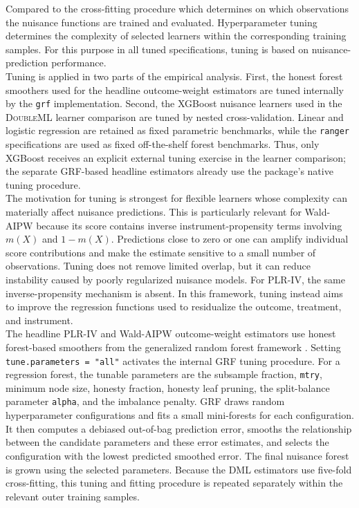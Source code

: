 \documentclass[12pt, a4paper, oneside]{article}
\theoremstyle{plain}
\theoremstyle{definition}
\begin{document}
Compared to the cross-fitting procedure which determines on which observations the nuisance functions are trained and evaluated.
 Hyperparameter tuning determines the complexity of selected
learners within the corresponding training samples.
For this purpose in all tuned specifications, tuning is based on nuisance-prediction performance.\\
Tuning is applied in two parts of the empirical analysis. First, the honest
forest smoothers used for the headline outcome-weight estimators are tuned
internally by the \texttt{grf} implementation. Second, the XGBoost nuisance
learners used in the \textsc{DoubleML} learner comparison are tuned by nested
cross-validation. Linear and logistic regression are retained as fixed
parametric benchmarks, while the \texttt{ranger} specifications are used as
fixed off-the-shelf forest benchmarks. 
Thus, only XGBoost receives an explicit
external tuning exercise in the learner comparison; the separate GRF-based
headline estimators already use the package's native tuning procedure.\\
The motivation for tuning is strongest for flexible learners whose complexity
can materially affect nuisance predictions. This is particularly relevant for
Wald-AIPW because its score contains inverse instrument-propensity terms
involving \(m(X)\) and \(1-m(X)\). Predictions close to zero or one can amplify
individual score contributions and make the estimate sensitive to a small
number of observations. Tuning does not remove limited overlap, but it can
reduce instability caused by poorly regularized nuisance models. For PLR-IV,
the same inverse-propensity mechanism is absent.
In this framework, tuning instead aims to
improve the regression functions used to residualize the outcome, treatment,
and instrument.\\
The headline PLR-IV and Wald-AIPW outcome-weight estimators use honest
forest-based smoothers from the generalized random forest framework
\citep{athey2019generalized,knaus2024treatment}. Setting
\texttt{tune.parameters = "all"} activates the internal GRF tuning procedure.
For a regression forest, the tunable parameters are the subsample fraction,
\texttt{mtry}, minimum node size, honesty fraction, honesty leaf pruning,
the split-balance parameter \texttt{alpha}, and the imbalance penalty.
GRF draws random hyperparameter configurations and fits a small
mini-forests for each configuration. It then computes a debiased
out-of-bag prediction error, smooths the relationship between the candidate
parameters and these error estimates, and selects the configuration with the
lowest predicted smoothed error. The final nuisance forest is grown using the
selected parameters. Because the DML estimators use five-fold cross-fitting,
this tuning and fitting procedure is repeated separately within the relevant
outer training samples.\\
\end{document}
